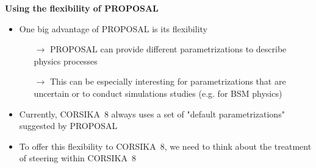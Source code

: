 \documentclass[aspectratio=1610, 9pt]{beamer}
\begin{document}
\begin{frame}

  \textbf{Using the flexibility of PROPOSAL}

    \begin{itemize}
      \item One big advantage of PROPOSAL is its flexibility
      \begin{itemize}
        \item[$\rightarrow$] PROPOSAL can provide different parametrizations to describe physics processes
        \item[$\rightarrow$] This can be especially interesting for parametrizations that are uncertain or to conduct simulations studies (e.g. for BSM physics)
      \end{itemize}
      \item Currently, CORSIKA~8 always uses a set of "default parametrizations" suggested by PROPOSAL
      \item To offer this flexibility to CORSIKA~8, we need to think about the treatment of steering within CORSIKA~8
    \end{itemize}
\end{frame}
\end{document}
